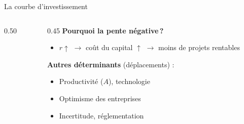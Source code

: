 \documentclass[aspectratio=169]{beamer}
\begin{document}
\begin{frame}[t]{La courbe d'investissement}\examtag
   \begin{columns}[T]
      \begin{column}{0.50\textwidth}
         \centering
      \end{column}
      \begin{column}{0.45\textwidth}
         \small
         \vspace{0.3cm}
         \textbf{Pourquoi la pente négative\,?}
         \vspace{0.2cm}
         \begin{itemize}
            \setlength\itemsep{0.2cm}
            \item $r \uparrow$ $\to$ coût du capital $\uparrow$ $\to$ moins de projets rentables
         \end{itemize}
         \vspace{0.3cm}
         \textbf{Autres déterminants} (déplacements) :
         \vspace{0.1cm}
         \begin{itemize}
            \setlength\itemsep{0.12cm}
            \item Productivité ($A$), technologie
            \item Optimisme des entreprises
            \item Incertitude, réglementation
         \end{itemize}
      \end{column}
   \end{columns}
\end{frame}
\end{document}

